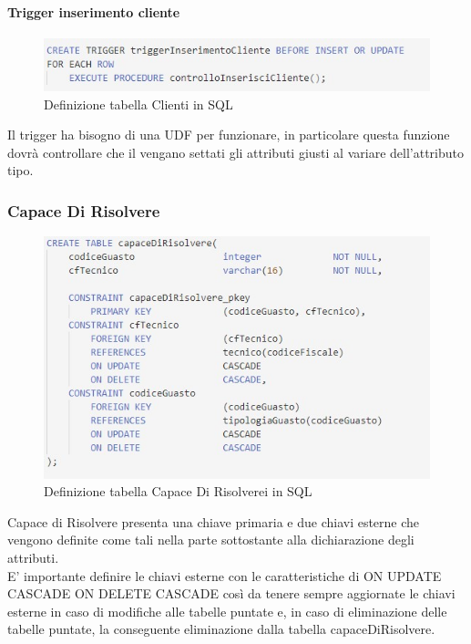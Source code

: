\documentclass[legalpaper]{article}
\begin{document}
		\paragraph{Trigger inserimento cliente}
			\begin{figure}[h]
				\centering
				\includegraphics[width=0.9\linewidth]{Immagini SQL/triggerInserimentoCliente}
				\caption{Definizione tabella Clienti in SQL}
				\label{clientesql}
			\end{figure}
		Il trigger ha bisogno di una UDF per funzionare, in particolare questa funzione dovrà controllare che il vengano settati gli attributi giusti al variare dell'attributo tipo.\\

	\subsubsection{Capace Di Risolvere}
		\begin{figure}[h]
			\centering
			\includegraphics[width=0.9\linewidth]{Immagini SQL/capaceDiRisolvere}
			\caption{Definizione tabella Capace Di Risolverei in SQL}
			\label{CapaceDiRisolveresql}
		\end{figure}
		Capace di Risolvere presenta una chiave primaria e due chiavi esterne che 
		vengono definite come tali nella parte sottostante alla 	dichiarazione degli attributi. \\
		E' importante definire le chiavi esterne con le caratteristiche di ON UPDATE CASCADE ON DELETE CASCADE
		così da tenere sempre aggiornate le chiavi esterne in caso di modifiche alle tabelle puntate e, in caso di eliminazione delle tabelle 				puntate, la conseguente eliminazione dalla tabella capaceDiRisolvere.
\end{document}
